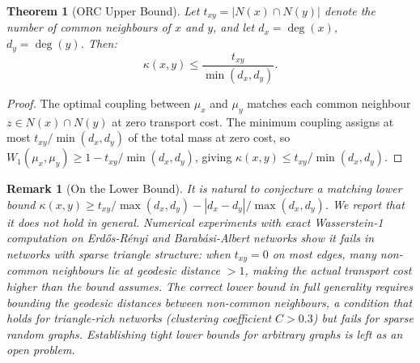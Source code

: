 \documentclass[11pt,a4paper]{article}
\newtheorem{theorem}{Theorem}
\newtheorem{remark}{Remark}
\begin{document}
\begin{theorem}[ORC Upper Bound]
\label{thm:orc_upper}
Let $t_{xy} = |N(x) \cap N(y)|$ denote the number of common
neighbours of $x$ and $y$, and let $d_x = \deg(x)$, $d_y = \deg(y)$.
Then:
\begin{equation}
\kappa(x,y) \leq \frac{t_{xy}}{\min(d_x, d_y)}.
\label{eq:orc_upper}
\end{equation}
\end{theorem}

\begin{proof}
The optimal coupling between $\mu_x$ and $\mu_y$ matches each
common neighbour $z \in N(x) \cap N(y)$ at zero transport cost.
The minimum coupling assigns at most $t_{xy}/\min(d_x, d_y)$ of the
total mass at zero cost, so
$W_1(\mu_x, \mu_y) \geq 1 - t_{xy}/\min(d_x, d_y)$,
giving $\kappa(x,y) \leq t_{xy}/\min(d_x, d_y)$.
\end{proof}

\begin{remark}[On the Lower Bound]
\label{rem:lower_bound}
It is natural to conjecture a matching lower bound
$\kappa(x,y) \geq t_{xy}/\max(d_x,d_y) - |d_x-d_y|/\max(d_x,d_y)$.
We report that it does not hold in general. Numerical experiments with
exact Wasserstein-1 computation on Erdős-Rényi and Barabási-Albert
networks show it fails in networks with sparse triangle structure: when
$t_{xy} = 0$ on most edges, many non-common neighbours lie
at geodesic distance $> 1$, making the actual transport cost
higher than the bound assumes. The correct lower bound in full
generality requires bounding the geodesic distances between
non-common neighbours, a condition that holds for
triangle-rich networks (clustering coefficient $C > 0.3$)
but fails for sparse random graphs. Establishing tight lower
bounds for arbitrary graphs is left as an open problem.
\end{remark}
\end{document}
